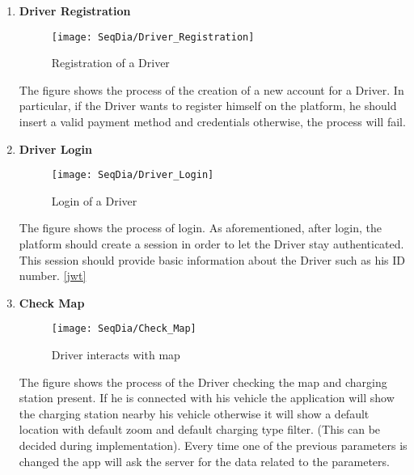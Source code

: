 \begin{enumerate}
        \newpage
        \item \textbf{Driver Registration}
        \begin{figure}[H]
            \begin{center}
            \texttt{[image: SeqDia/Driver\_Registration]}
            \caption{Registration of a Driver}
            \label{fig:DriverRegistration}
            \end{center}
        \end{figure}
        The figure shows the process of the creation of a new account for a Driver. In particular, if the Driver wants to register himself on the platform, he should insert a valid payment method and credentials otherwise, the process will fail.
        \newpage
        \item \textbf{Driver Login}
        \begin{figure}[H]
            \begin{center}
            \texttt{[image: SeqDia/Driver\_Login]}
            \caption{Login of a Driver}
            \label{fig:DriverLogin}
            \end{center}
        \end{figure}
        The figure shows the process of login. As aforementioned, after login, the platform should create a session in order to let the Driver stay authenticated. This session should provide basic information about the Driver such as his ID number. \ref{jwt}
        \newpage
        \item \textbf{Check Map}
        \begin{figure}[H]
            \begin{center}
            \texttt{[image: SeqDia/Check\_Map]}
            \caption{Driver interacts with map}
            \label{fig:CheckMap}
            \end{center}
        \end{figure}
        The figure shows the process of the Driver checking the map and charging station present. If he is connected with his vehicle the application will show the charging station nearby his vehicle otherwise it will show a default location with default zoom and default charging type filter. (This can be decided during implementation). Every time one of the previous parameters is changed the app will ask the server for the data related to the parameters.

\end{enumerate}
